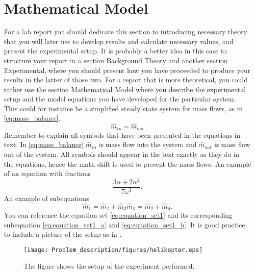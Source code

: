 \section{Mathematical Model}
\label{sec:problem_description}
For a lab report you should dedicate this section to introducing necessary theory that you will later use to develop results and calculate necessary values, and present the experimental setup. It is probably a better idea in this case to structure your report in a section Background Theory and another section Experimental, where you should present how you have proceeded to produce your results in the latter of those two. For a report that is more theoretical, you could rather use the section Mathematical Model where you describe the experimental setup and the model equations you have developed for the particular system. This could for instance be a simplified steady state system for mass flows, as in \eqref{eq:mass_balance}.
\begin{equation}
    \label{eq:mass_balance}
    \hat{m}_{in} = \hat{m}_{out}
\end{equation}
Remember to explain all symbols that have been presented in the equations in text. In \eqref{eq:mass_balance} $\hat{m}_{in}$ is mass flow into the system and $\hat{m}_{out}$ is mass flow out of the system. All symbols should appear in the text exactly as they do in the equations, hence the math shift is used to present the mass flows.
An example of an equation with fractions
\begin{equation}
    \frac
    {3\alpha + 2\alpha^2}
    {7\omega^3}.
\end{equation}
An example of subequations
\begin{subequations}
    \label{eq:equation_set1}
    \begin{equation}
        \label{eq:equation_set1_a}
        \hat{m}_{1} = \hat{m}_{2} + \hat{m}_{3}
    \end{equation}
    \begin{equation}
        \label{eq:equation_set1_b}
        \hat{m}_{3} = \hat{m}_{2} + \hat{m}_{4}.
    \end{equation}
\end{subequations}
You can reference the equation set \eqref{eq:equation_set1} and its corresponding subequation \eqref{eq:equation_set1_a} and \eqref{eq:equation_set1_b}.
It is good practice to include a picture of the setup as in .
\begin{figure}[htb]
    \centering
    \texttt{[image: Problem\_description/figures/helikopter.eps]}
    \caption{The figure shows the setup of the experiment performed.}
    \label{fig:setup}
\end{figure}
